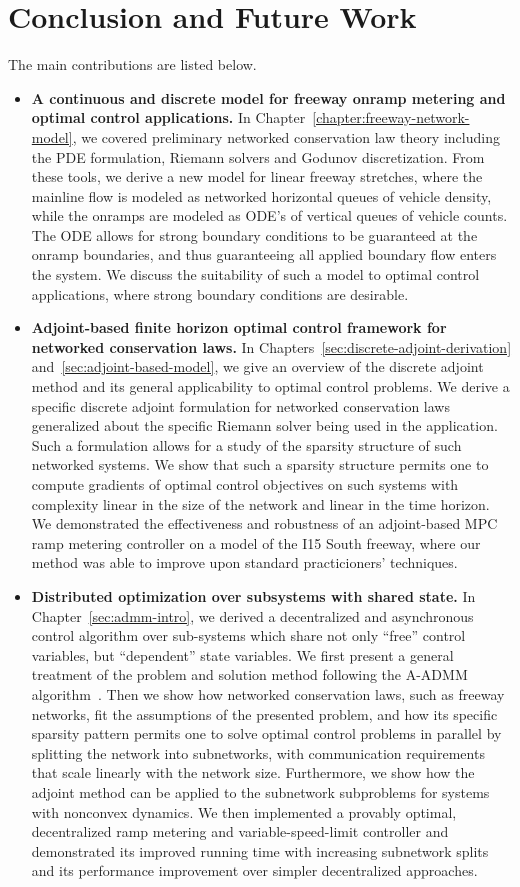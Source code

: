\chapter{Conclusion and Future Work}

The main contributions are listed below.

\begin{itemize}
	\item \textbf{A continuous and discrete model for freeway onramp metering and optimal control applications.} In Chapter~\ref{chapter:freeway-network-model}, we covered preliminary networked conservation law theory including the PDE formulation, Riemann solvers and Godunov discretization. From these tools, we derive a new model for linear freeway stretches, where the mainline flow is modeled as networked horizontal queues of vehicle density, while the onramps are modeled as ODE's of vertical queues of vehicle counts. The ODE allows for strong boundary conditions to be guaranteed at the onramp boundaries, and thus guaranteeing all applied boundary flow enters the system. We discuss the suitability of such a model to optimal control applications, where strong boundary conditions are desirable.
	\item \textbf{Adjoint-based finite horizon optimal control framework for networked conservation laws.} In Chapters~\ref{sec:discrete-adjoint-derivation} and~\ref{sec:adjoint-based-model}, we give an overview of the discrete adjoint method and its general applicability to optimal control problems. We derive a specific discrete adjoint formulation for networked conservation laws generalized about the specific Riemann solver being used in the application. Such a formulation allows for a study of the sparsity structure of such networked systems. We show that such a sparsity structure permits one to compute gradients of optimal control objectives on such systems with complexity linear in the size of the network and linear in the time horizon. We demonstrated the effectiveness and robustness of an adjoint-based MPC ramp metering controller on a model of the I15 South freeway, where our method was able to improve upon standard practicioners' techniques.
	\item \textbf{Distributed optimization over subsystems with shared state.} In Chapter~\ref{sec:admm-intro}, we derived a decentralized and asynchronous control algorithm over sub-systems which share not only ``free'' control variables, but ``dependent'' state variables. We first present a general treatment of the problem and solution method following the A-ADMM algorithm~\cite{Wei2013On}. Then we show how networked conservation laws, such as freeway networks, fit the assumptions of the presented problem, and how its specific sparsity pattern permits one to solve optimal control problems in parallel by splitting the network into subnetworks, with communication requirements that scale linearly with the network size. Furthermore, we show how the adjoint method can be applied to the subnetwork subproblems for systems with nonconvex dynamics. We then implemented a provably optimal, decentralized ramp metering and variable-speed-limit controller and demonstrated its improved running time with increasing subnetwork splits and its performance improvement over simpler decentralized approaches.

\end{itemize}
